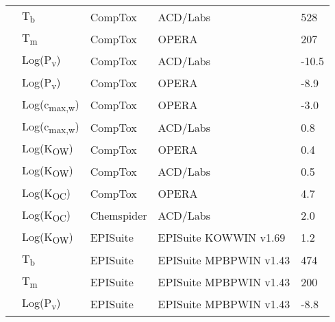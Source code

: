 \begin{landscape}
\begin{longtable}[c]{lllll}
          & T\textsubscript{b}          & CompTox    & ACD/Labs                                                                        & 528   \\
          & T\textsubscript{m}          & CompTox    & OPERA                                                                           & 207   \\
          & Log(P\textsubscript{v})       & CompTox    & ACD/Labs                                                                        & -10.5 \\
          & Log(P\textsubscript{v})       & CompTox    & OPERA                                                                           & -8.9  \\
          & Log(c\textsubscript{max,w}) & CompTox    & OPERA                                                                           & -3.0  \\
          & Log(c\textsubscript{max,w}) & CompTox    & ACD/Labs                                                                        & 0.8   \\
          & Log(K\textsubscript{OW})      & CompTox    & OPERA                                                                           & 0.4   \\
          & Log(K\textsubscript{OW})      & CompTox    & ACD/Labs                                                                        & 0.5   \\
          & Log(K\textsubscript{OC})      & CompTox    & OPERA                                                                           & 4.7   \\
          & Log(K\textsubscript{OC})      & Chemspider & ACD/Labs                                                                        & 2.0   \\
          & Log(K\textsubscript{OW})      & EPISuite   & EPISuite KOWWIN v1.69                                                           & 1.2   \\
          & T\textsubscript{b}          & EPISuite   & EPISuite MPBPWIN v1.43                                                          & 474   \\
          & T\textsubscript{m}          & EPISuite   & EPISuite MPBPWIN v1.43                                                          & 200   \\
          & Log(P\textsubscript{v})       & EPISuite   & EPISuite MPBPWIN v1.43                                                          & -8.8  \\

\end{longtable}
\end{landscape}
